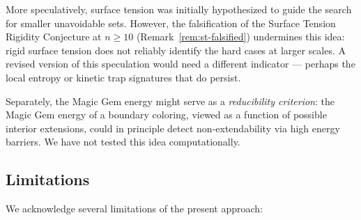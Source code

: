 More speculatively, surface tension was initially hypothesized to guide
the search for smaller unavoidable sets. However, the falsification of
the Surface Tension Rigidity Conjecture at $n \geq 10$
(Remark~\ref{rem:st-falsified}) undermines this idea: rigid surface
tension does not reliably identify the hard cases at larger scales. A
revised version of this speculation would need a different indicator —
perhaps the local entropy or kinetic trap signatures that do persist.

Separately, the Magic Gem energy might serve as a \emph{reducibility
criterion}: the Magic Gem energy of a boundary coloring, viewed as a
function of possible interior extensions, could in principle detect
non-extendability via high energy barriers. We have not tested this
idea computationally.

\subsection{Limitations}\label{sec:limitations}

We acknowledge several limitations of the present approach:

